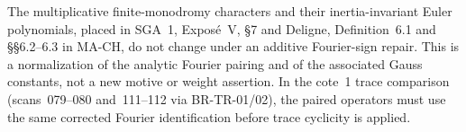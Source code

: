 The multiplicative finite-monodromy characters and their
inertia-invariant Euler polynomials, placed in SGA~1,
Expos\'e~V, \S7 and Deligne, Definition~6.1 and
\S\S6.2--6.3 in MA-CH, do not change under an additive
Fourier-sign repair. This is a normalization of the analytic
Fourier pairing and of the associated Gauss constants, not a
new motive or weight assertion. In the cote~1 trace comparison
(scans~079--080 and~111--112 via BR-TR-01/02), the paired
operators must use the same corrected Fourier identification
before trace cyclicity is applied.
